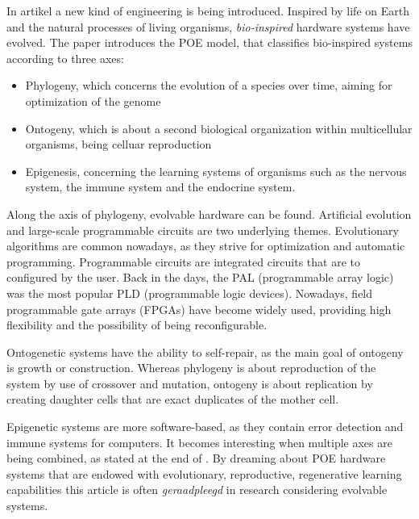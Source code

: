 
In artikel \cite{poe} a new kind of engineering is being introduced. Inspired by life on Earth and the natural processes of living organisms, \emph{bio-inspired} hardware systems have evolved. The paper introduces the POE model, that classifies bio-inspired systems according to three axes:
\begin{itemize}
	\item Phylogeny, which concerns the evolution of a species over time, aiming for optimization of the genome
	\item Ontogeny, which is about a second biological organization within multicellular organisms, being celluar reproduction
	\item Epigenesis, concerning the learning systems of organisms such as the nervous system, the immune system and the endocrine system.
\end{itemize}

Along the axis of phylogeny, evolvable hardware can be found. Artificial evolution and large-scale programmable circuits are two underlying themes. Evolutionary algorithms are common nowadays, as they strive for optimization and automatic programming. Programmable circuits are integrated circuits that are to configured by the user. Back in the days, the PAL (programmable array logic) was the most popular PLD (programmable logic devices). Nowadays, field programmable gate arrays (FPGAs) have become widely used, providing high flexibility and the possibility of being reconfigurable.

Ontogenetic systems have the ability to self-repair, as the main goal of ontogeny is growth or construction. Whereas phylogeny is about reproduction of the system by use of crossover and mutation, ontogeny is about replication by creating daughter cells that are exact duplicates of the mother cell.

Epigenetic systems are more software-based, as they contain error detection and immune systems for computers. It becomes interesting when multiple axes are being combined, as stated at the end of \cite{poe}. By dreaming about POE hardware systems that are endowed with evolutionary, reproductive, regenerative learning capabilities this article is often \emph{geraadpleegd} in research considering evolvable systems.